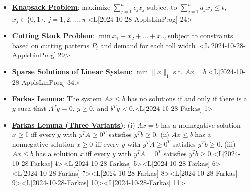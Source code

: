 \documentclass{article}%
\begin{document}
\begin{itemize}[[leftmargin=*]]
\item \href{https://www.math.purdue.edu/~yipn/421/2024-10-28-ApplsLinProg.pdf#page=24}{\textbf{Knapsack Problem}}: maximize $\sum_{j=1}^n c_j x_j$ subject to $\sum_{j=1}^n a_j x_j \le b$, $x_j \in \{0, 1\}$, $j = 1, 2, \dots, n$ <L[2024-10-28-ApplsLinProg] 24>%
\item \href{https://www.math.purdue.edu/~yipn/421/2024-10-28-ApplsLinProg.pdf#page=29}{\textbf{Cutting Stock Problem}}: $\min x_1 + x_2 + \dots + x_{12}$ subject to  constraints based on cutting patterns $P_i$ and demand for each roll width. <L[2024-10-28-ApplsLinProg] 29>%
\item \href{https://www.math.purdue.edu/~yipn/421/2024-10-28-ApplsLinProg.pdf#page=34}{\textbf{Sparse Solutions of Linear System}}: $\min \|x\|_1$ s.t. $Ax = b$ <L[2024-10-28-ApplsLinProg] 34>%
\end{itemize}%
\begin{itemize}[[leftmargin=*]]%
\item \href{https://www.math.purdue.edu/~yipn/421/2024-10-28-Farkas.pdf#page=1}{\textbf{Farkas Lemma}}: The system $Ax \le b$ has no solutions if and only if there is a $y$ such that $A^T y = 0$, $y \ge 0$, and $b^T y < 0$.<L[2024-10-28-Farkas] 1>%
\item \href{https://www.math.purdue.edu/~yipn/421/2024-10-28-Farkas.pdf#page=4}{\textbf{Farkas Lemma (Three Variants)}}: (i) $Ax = b$ has a nonnegative solution $x \ge 0$ iff every $y$ with $y^T A \ge 0^T$ satisfies $y^T b \ge 0$. (ii) $Ax \le b$ has a nonnegative solution $x \ge 0$ iff every $y$ with $y^T A \ge 0^T$ satisfies $y^T b \ge 0$. (iii) $Ax \le b$ has a solution $x$ iff every $y$ with $y^T A = 0^T$ satisfies $y^T b \ge 0$.<L[2024-10-28-Farkas] 4><L[2024-10-28-Farkas] 5><L[2024-10-28-Farkas] 6><L[2024-10-28-Farkas] 7><L[2024-10-28-Farkas] 8><L[2024-10-28-Farkas] 9><L[2024-10-28-Farkas] 10><L[2024-10-28-Farkas] 11>%
\end{itemize}%
\end{document}
